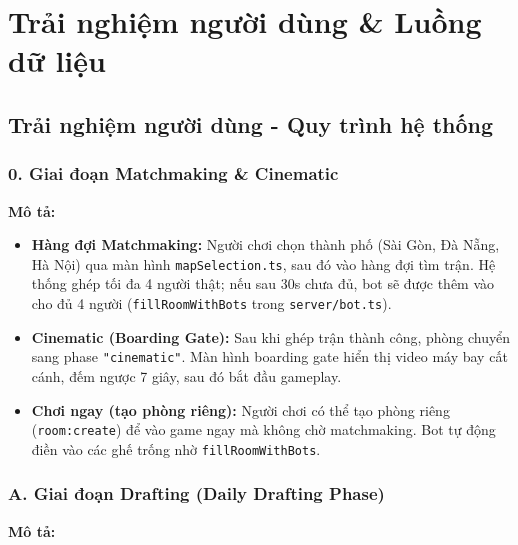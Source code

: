 \newpage

\section{Trải nghiệm người dùng \& Luồng dữ liệu}

\subsection{Trải nghiệm người dùng - Quy trình hệ thống}

\subsubsection{0. Giai đoạn Matchmaking \& Cinematic}

\textbf{Mô tả:}

\begin{itemize}[topsep=0pt, itemsep=2pt, leftmargin=1.2cm]
    \item \textbf{Hàng đợi Matchmaking:} Người chơi chọn thành phố (Sài Gòn, Đà Nẵng, Hà Nội) qua màn hình \texttt{mapSelection.ts}, sau đó vào hàng đợi tìm trận. Hệ thống ghép tối đa 4 người thật; nếu sau 30s chưa đủ, bot sẽ được thêm vào cho đủ 4 người (\texttt{fillRoomWithBots} trong \texttt{server/bot.ts}).

    \item \textbf{Cinematic (Boarding Gate):} Sau khi ghép trận thành công, phòng chuyển sang phase \texttt{"cinematic"}. Màn hình boarding gate hiển thị video máy bay cất cánh, đếm ngược 7 giây, sau đó bắt đầu gameplay.

    \item \textbf{Chơi ngay (tạo phòng riêng):} Người chơi có thể tạo phòng riêng (\texttt{room:create}) để vào game ngay mà không chờ matchmaking. Bot tự động điền vào các ghế trống nhờ \texttt{fillRoomWithBots}.
\end{itemize}

\subsubsection{A. Giai đoạn Drafting (Daily Drafting Phase)}

\textbf{Mô tả:}

